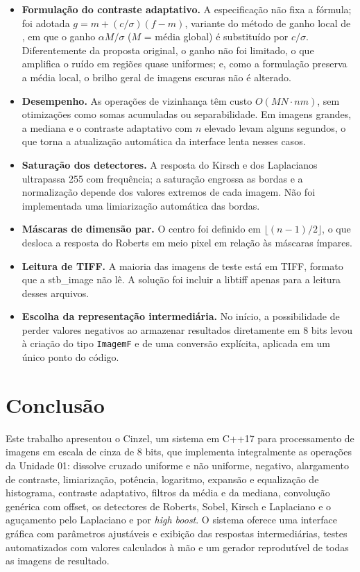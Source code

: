 \documentclass[11pt,a4paper]{article}
\begin{document}
\begin{itemize}
  \item \textbf{Formulação do contraste adaptativo.} A especificação não fixa a fórmula; foi
        adotada $g = m + (c/\sigma)(f - m)$, variante do método de ganho local de
        \cite{narendra}, em que o ganho $\alpha M/\sigma$ ($M$ = média global) é substituído
        por $c/\sigma$. Diferentemente da proposta original, o ganho não foi limitado, o que
        amplifica o ruído em regiões quase uniformes; e, como a formulação preserva a média
        local, o brilho geral de imagens escuras não é alterado.
  \item \textbf{Desempenho.} As operações de vizinhança têm custo $O(MN \cdot nm)$, sem
        otimizações como somas acumuladas ou separabilidade. Em imagens grandes, a mediana e o
        contraste adaptativo com $n$ elevado levam alguns segundos, o que torna a atualização
        automática da interface lenta nesses casos.
  \item \textbf{Saturação dos detectores.} A resposta do Kirsch e dos Laplacianos ultrapassa
        255 com frequência; a saturação engrossa as bordas e a normalização depende dos valores
        extremos de cada imagem. Não foi implementada uma limiarização automática das bordas.
  \item \textbf{Máscaras de dimensão par.} O centro foi definido em
        $\lfloor (n-1)/2 \rfloor$, o que desloca a resposta do Roberts em meio pixel em relação
        às máscaras ímpares.
  \item \textbf{Leitura de TIFF.} A maioria das imagens de teste está em TIFF, formato que a
        stb\_image não lê. A solução foi incluir a libtiff apenas para a leitura desses
        arquivos.
  \item \textbf{Escolha da representação intermediária.} No início, a possibilidade de perder
        valores negativos ao armazenar resultados diretamente em 8 bits levou à criação do tipo
        \texttt{ImagemF} e de uma conversão explícita, aplicada em um único ponto do código.
\end{itemize}

\section{Conclusão}

Este trabalho apresentou o Cinzel, um sistema em C++17 para processamento de imagens em escala
de cinza de 8 bits, que implementa integralmente as operações da Unidade 01: dissolve cruzado
uniforme e não uniforme, negativo, alargamento de contraste, limiarização, potência, logaritmo,
expansão e equalização de histograma, contraste adaptativo, filtros da média e da mediana,
convolução genérica com offset, os detectores de Roberts, Sobel, Kirsch e Laplaciano e o
aguçamento pelo Laplaciano e por \textit{high boost}. O sistema oferece uma interface gráfica
com parâmetros ajustáveis e exibição das respostas intermediárias, testes automatizados com
valores calculados à mão e um gerador reprodutível de todas as imagens de resultado.
\end{document}

